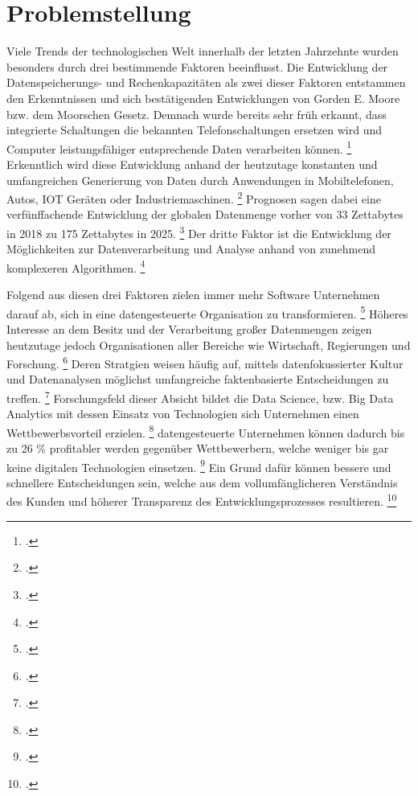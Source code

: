 \chapter[Problemstellung]{Problemstellung}

Viele Trends der technologischen Welt innerhalb der letzten Jahrzehnte wurden besonders durch drei bestimmende Faktoren beeinflusst.
Die Entwicklung der Datenspeicherungs- und Rechenkapazitäten als zwei dieser Faktoren entstammen den Erkenntnissen und sich bestätigenden Entwicklungen von Gorden E. Moore bzw. dem Moorschen Gesetz. \parencite[Vgl.][S. 1]{Moore.1998} %
Demnach wurde bereits sehr früh erkannt, dass integrierte Schaltungen die bekannten Telefonschaltungen ersetzen wird und Computer leistungsfähiger entsprechende Daten verarbeiten können. \footcite[Vgl.][S. 1]{Moore.1998}
Erkenntlich wird diese Entwicklung anhand der heutzutage konstanten und umfangreichen Generierung von Daten durch Anwendungen in Mobiltelefonen, Autos, IOT Geräten oder Industriemaschinen. \footcite[Vgl.][S 3f.]{Dalpiaz.2020}
Prognosen sagen dabei eine verfünffachende Entwicklung der globalen Datenmenge vorher von 33 Zettabytes in 2018 zu 175 Zettabytes in 2025. \footcite[prenote][postnote]{Increase from global data 2018}
Der dritte Faktor ist die Entwicklung der Möglichkeiten zur Datenverarbeitung und Analyse anhand von zunehmend komplexeren Algorithmen. \footcite[Vgl.][S. 4]{Dalpiaz.2020}

Folgend aus diesen drei Faktoren zielen immer mehr Software Unternehmen darauf ab, sich in eine datengesteuerte Organisation zu transformieren. \footcite[Vgl.][S. 1]{Fabijan.2017}
Höheres Interesse an dem Besitz und der Verarbeitung großer Datenmengen zeigen heutzutage jedoch Organisationen aller Bereiche wie Wirtschaft, Regierungen und Forschung. \footcite[Vgl.][S. 1]{Pratt.2023}
Deren Stratgien weisen häufig auf, mittels datenfokussierter Kultur und Datenanalysen möglichst umfangreiche faktenbasierte Entscheidungen zu treffen. \footcite[Vgl.][S. 18]{Dalpiaz.2020}
Forschungsfeld dieser Absicht bildet die Data Science, bzw. Big Data Analytics mit dessen Einsatz von Technologien sich Unternehmen einen Wettbewerbsvorteil erzielen. \footcite[Vgl.][S. 3]{Dalpiaz.2020}
datengesteuerte Unternehmen können dadurch bis zu 26 \% profitabler werden gegenüber Wettbewerbern, welche weniger bis gar keine digitalen Technologien einsetzen. \footcite[Vgl.][S. 1]{Fabijan.2017}
Ein Grund dafür können bessere und schnellere Entscheidungen sein, welche aus dem vollumfänglicheren Verständnis des Kunden und höherer Transparenz des Entwicklungsprozesses resultieren. \footcite[Vgl.][S. 18]{Dalpiaz.2020}

